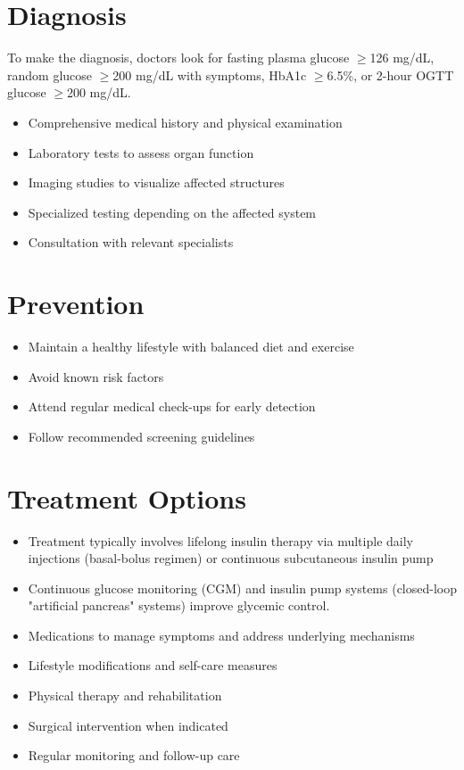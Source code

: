 \section{Diagnosis}
To make the diagnosis, doctors look for fasting plasma glucose $\geq$126 mg/dL, random glucose $\geq$200 mg/dL with symptoms, HbA1c $\geq$6.5\%, or 2-hour OGTT glucose $\geq$200 mg/dL.

\begin{itemize}[noitemsep]
  \item Comprehensive medical history and physical examination
  \item Laboratory tests to assess organ function
  \item Imaging studies to visualize affected structures
  \item Specialized testing depending on the affected system
  \item Consultation with relevant specialists
\end{itemize}
\section{Prevention}
\begin{itemize}[noitemsep]
  \item Maintain a healthy lifestyle with balanced diet and exercise
  \item Avoid known risk factors
  \item Attend regular medical check-ups for early detection
  \item Follow recommended screening guidelines
\end{itemize}
\section{Treatment Options}
\begin{itemize}[noitemsep]
  \item Treatment typically involves lifelong insulin therapy via multiple daily injections (basal-bolus regimen) or continuous subcutaneous insulin pump
  \item Continuous glucose monitoring (CGM) and insulin pump systems (closed-loop "artificial pancreas" systems) improve glycemic control.
  \item Medications to manage symptoms and address underlying mechanisms
  \item Lifestyle modifications and self-care measures
  \item Physical therapy and rehabilitation
  \item Surgical intervention when indicated
  \item Regular monitoring and follow-up care
\end{itemize}
